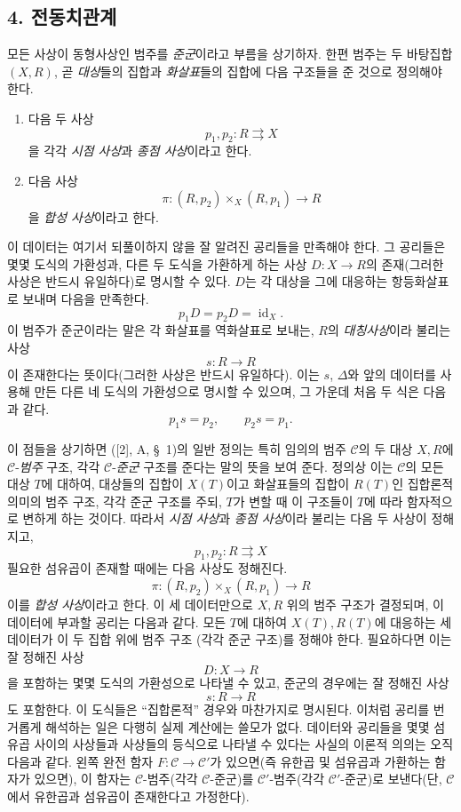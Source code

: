 \subsection*{4. 전동치관계}

모든 사상이 동형사상인 범주를 \emph{준군}이라고 부름을 상기하자. 한편
범주는 두 바탕집합 $(X,R)$, 곧 \emph{대상}들의 집합과 \emph{화살표}들의
집합에 다음 구조들을 준 것으로 정의해야 한다.
\begin{enumerate}
\item[(i)] 다음 두 사상
\[
  p_1,p_2:R\rightrightarrows X
\]
을 각각 \emph{시점 사상}과 \emph{종점 사상}이라고 한다.

\item[(ii)] 다음 사상
\[
  \pi:(R,p_2)\times_X(R,p_1)\longrightarrow R
\]
을 \emph{합성 사상}이라고 한다.
\end{enumerate}
이 데이터는 여기서 되풀이하지 않을 잘 알려진 공리들을 만족해야 한다.
그 공리들은 몇몇 도식의 가환성과, 다른 두 도식을 가환하게 하는 사상
$D:X\to R$의 존재(그러한 사상은 반드시 유일하다)로 명시할 수 있다.
$D$는 각 대상을 그에 대응하는 항등화살표로 보내며 다음을 만족한다.
\[
  p_1D=p_2D=\operatorname{id}_X.
\]
이 범주가 준군이라는 말은 각 화살표를 역화살표로 보내는, $R$의
\emph{대칭사상}이라 불리는 사상
\[
  s:R\longrightarrow R
\]
이 존재한다는 뜻이다(그러한 사상은 반드시 유일하다). 이는 $s$,
$\Delta$와 앞의 데이터를 사용해 만든 다른 네 도식의 가환성으로 명시할
수 있으며, 그 가운데 처음 두 식은 다음과 같다.
\[
  p_1s=p_2,\qquad p_2s=p_1.
\]

이 점들을 상기하면 ([2], A, \S~1)의 일반 정의는 특히 임의의 범주
$\mathcal C$의 두 대상 $X,R$에 $\mathcal C$-\emph{범주} 구조, 각각
$\mathcal C$-\emph{준군} 구조를 준다는 말의 뜻을 보여 준다. 정의상 이는
$\mathcal C$의 모든 대상 $T$에 대하여, 대상들의 집합이 $X(T)$이고
화살표들의 집합이 $R(T)$인 집합론적 의미의 범주 구조, 각각 준군 구조를
주되, $T$가 변할 때 이 구조들이 $T$에 따라
\guillemotleft 함자적으로 변하게\guillemotright{} 하는 것이다. 따라서
\emph{시점 사상}과 \emph{종점 사상}이라 불리는 다음 두 사상이 정해지고,
\[
  p_1,p_2:R\rightrightarrows X
\]
필요한 섬유곱이 존재할 때에는 다음 사상도 정해진다.
\[
  \pi:(R,p_2)\times_X(R,p_1)\longrightarrow R
\]
이를 \emph{합성 사상}이라고 한다. 이 세 데이터만으로 $X,R$ 위의 범주
구조가 결정되며, 이 데이터에 부과할 공리는 다음과 같다. 모든 $T$에
대하여 $X(T),R(T)$에 대응하는 세 데이터가 이 두 집합 위에 범주 구조
(각각 준군 구조)를 정해야 한다. 필요하다면 이는 잘 정해진 사상
\[
  D:X\longrightarrow R
\]
을 포함하는 몇몇 도식의 가환성으로 나타낼 수 있고, 준군의 경우에는 잘
정해진 사상
\[
  s:R\longrightarrow R
\]
도 포함한다. 이 도식들은 ``집합론적'' 경우와 마찬가지로 명시된다. 이처럼
공리를 번거롭게 해석하는 일은 다행히 실제 계산에는 쓸모가 없다. 데이터와
공리들을 몇몇 섬유곱 사이의 사상들과 사상들의 등식으로 나타낼 수 있다는
사실의 이론적 의의는 오직 다음과 같다. 왼쪽 완전 함자
$F:\mathcal C\to\mathcal C'$가 있으면(즉 유한곱 및 섬유곱과 가환하는
함자가 있으면), 이 함자는 $\mathcal C$-범주(각각 $\mathcal C$-준군)를
$\mathcal C'$-범주(각각 $\mathcal C'$-준군)로 보낸다(단, $\mathcal
C$에서 유한곱과 섬유곱이 존재한다고 가정한다).

